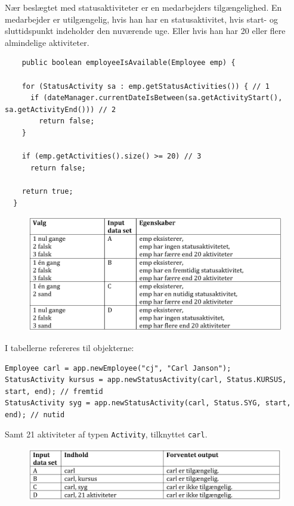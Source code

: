 Nær beslægtet med statusaktiviteter er en medarbejders tilgængelighed.
En medarbejder er utilgængelig, hvis han har en statusaktivitet, hvis start- og sluttidspunkt indeholder den nuværende uge. Eller hvis han har 20 eller flere  almindelige aktiviteter.

\begin{lstlisting}
    public boolean employeeIsAvailable(Employee emp) {

    for (StatusActivity sa : emp.getStatusActivities()) { // 1
      if (dateManager.currentDateIsBetween(sa.getActivityStart(), sa.getActivityEnd())) // 2
        return false;
    }

    if (emp.getActivities().size() >= 20) // 3
      return false;

    return true;
  }
\end{lstlisting}

\begin{figure}[H]
    \centering
    \includegraphics[width = \textwidth]{Figurer/whitebox4a.PNG}
    \label{fig:whitebox4a}
\end{figure}

I tabellerne refereres til objekterne:
\begin{lstlisting}
Employee carl = app.newEmployee("cj", "Carl Janson");
StatusActivity kursus = app.newStatusActivity(carl, Status.KURSUS, start, end); // fremtid
StatusActivity syg = app.newStatusActivity(carl, Status.SYG, start, end); // nutid
\end{lstlisting}

Samt 21 aktiviteter af typen \texttt{Activity}, tilknyttet \texttt{carl}.

\begin{figure}[H]
    \centering
    \includegraphics[width = \textwidth]{Figurer/whitebox4b.PNG}
    \label{fig:whitebox4b}
\end{figure}

